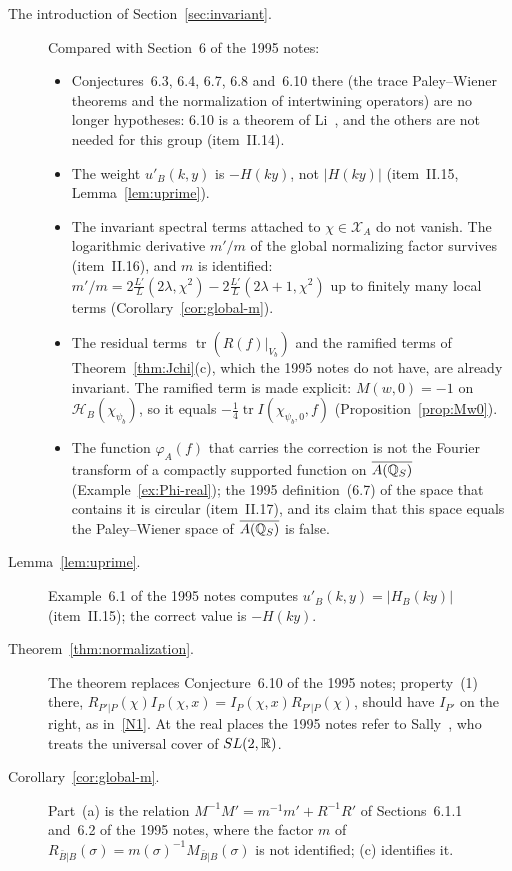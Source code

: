 \begin{description}
\item[The introduction of Section~\ref{sec:invariant}.] Compared with Section~6 of the 1995 notes:
\begin{itemize}
\item Conjectures~6.3, 6.4, 6.7, 6.8 and~6.10 there (the trace
  Paley--Wiener theorems and the normalization of intertwining
  operators) are no longer hypotheses: 6.10 is a theorem of
  Li~\cite{LiII}, and the others are not needed for this group
  (item~II.14).
\item The weight $u'_B(k,y)$ is $-H(ky)$, not $|H(ky)|$ (item~II.15,
  Lemma~\ref{lem:uprime}).
\item The invariant spectral terms attached to $\chi\in\mathcal X_A$ do
  not vanish. The logarithmic derivative $m'/m$ of the global normalizing
  factor survives (item~II.16), and $m$ is identified:
  $m'/m=2\frac{L'}{L}(2\lambda,\chi^2)-2\frac{L'}{L}(2\lambda+1,\chi^2)$
  up to finitely many local terms (Corollary~\ref{cor:global-m}).
\item The residual terms $\operatorname{tr}(R(f)|_{V_b})$ and the ramified
  terms of Theorem~\ref{thm:Jchi}(c), which the 1995 notes do not have,
  are already invariant. The ramified term is made explicit: $M(w,0)=-1$
  on $\mathcal H_B(\chi_{\psi_b})$, so it equals
  $-\frac14\operatorname{tr}I(\chi_{\psi_b,0},f)$
  (Proposition~\ref{prop:Mw0}).
\item The function $\varphi_A(f)$ that carries the correction is not the
  Fourier transform of a compactly supported function on $\overline{A(\mathbb{Q}_S)}$
  (Example~\ref{ex:Phi-real}); the 1995 definition~(6.7) of the space
  that contains it is circular (item~II.17), and its claim that this
  space equals the Paley--Wiener space of $\overline{A(\mathbb{Q}_S)}$ is false.
\end{itemize}

\item[Lemma~\ref{lem:uprime}.] Example~6.1 of the 1995 notes computes $u'_B(k,y)=|H_B(ky)|$ (item~II.15); the correct value is $-H(ky)$.

\item[Theorem~\ref{thm:normalization}.] The theorem replaces Conjecture~6.10 of the 1995 notes; property~(1) there, $R_{P'|P}(\chi)I_P(\chi,x)=I_P(\chi,x)R_{P'|P}(\chi)$, should have $I_{P'}$ on the right, as in~\ref{N1}. At the real places the 1995 notes refer to Sally~\cite{Sa}, who treats the universal cover of $SL(2,\mathbb{R})$.

\item[Corollary~\ref{cor:global-m}.] Part~(a) is the relation $M^{-1}M'=m^{-1}m'+R^{-1}R'$ of Sections~6.1.1
and~6.2 of the 1995 notes, where the factor $m$ of $R_{\bar B|B}(\sigma)=
m(\sigma)^{-1}M_{\bar B|B}(\sigma)$ is not identified; (c) identifies
it.


\end{description}

